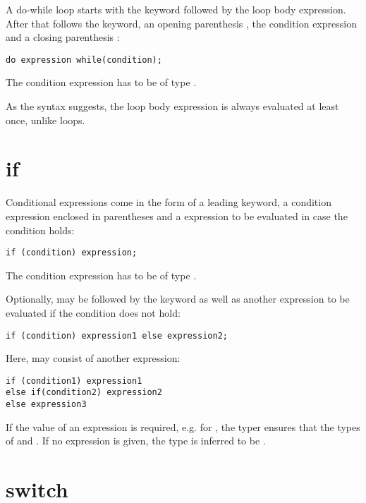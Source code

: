 A do-while loop starts with the  keyword followed by the loop body expression. After that follows the  keyword, an opening parenthesis \expr{(}, the condition expression and a closing parenthesis \expr{)}:

\begin{lstlisting}
do expression while(condition);
\end{lstlisting}

The condition expression has to be of type .

As the syntax suggests, the loop body expression is always evaluated at least once, unlike  loops.

\section{if}
\label{expression-if}

Conditional expressions come in the form of a leading  keyword, a condition expression enclosed in parentheses \expr{()} and a expression to be evaluated in case the condition holds:

\begin{lstlisting}
if (condition) expression;
\end{lstlisting}

The condition expression has to be of type .

Optionally,  may be followed by the  keyword as well as another expression to be evaluated if the condition does not hold:

\begin{lstlisting}
if (condition) expression1 else expression2;
\end{lstlisting}

Here,  may consist of another  expression:

\begin{lstlisting}
if (condition1) expression1
else if(condition2) expression2
else expression3
\end{lstlisting}

If the value of an  expression is required, e.g. for , the typer ensures that the types of  and  . If no  expression is given, the type is inferred to be .


\section{switch}
\label{expression-switch}

